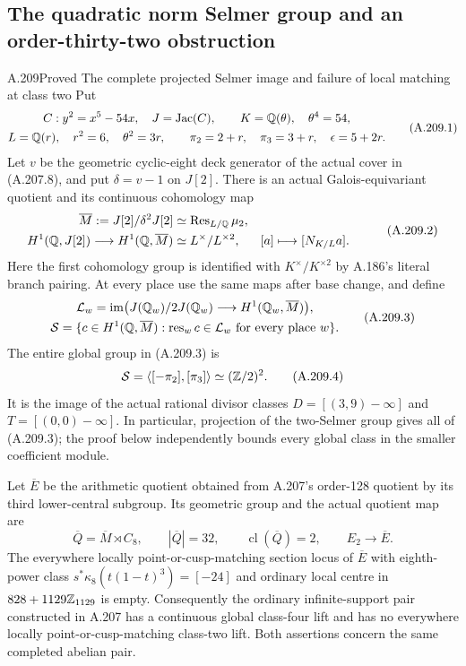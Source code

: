 \subsection{The quadratic norm Selmer group and an order-thirty-two obstruction}

\begin{statement}{A.209}{Proved}
{The complete projected Selmer image and failure of local matching at class two}
Put
\[
\begin{gathered}
 C:y^2=x^5-54x,\quad J=\operatorname{Jac}(C),\qquad
 K=\mathbb Q(\theta),\quad \theta^4=54,\\
 L=\mathbb Q(r),\quad r^2=6,\quad\theta^2=3r,\qquad
 \pi_2=2+r,\quad\pi_3=3+r,\quad\epsilon=5+2r.
\end{gathered}
\tag{A.209.1}
\]
Let \(v\) be the geometric cyclic-eight deck generator of
the actual cover in (A.207.8), and put \(\delta=v-1\)
on \(J[2]\).  There is an actual Galois-equivariant
quotient and its continuous cohomology map
\[
\begin{aligned}
 \overline M:=J[2]/\delta^2J[2]
      &\simeq\operatorname{Res}_{L/\mathbb Q}\mu_2,\\
 H^1(\mathbb Q,J[2])\longrightarrow H^1(\mathbb Q,\overline M)
      &\simeq L^\times/L^{\times2},
 & [a]&\longmapsto[N_{K/L}a].
\end{aligned}
\tag{A.209.2}
\]
Here the first cohomology group is identified with
\(K^\times/K^{\times2}\) by A.186's literal branch
pairing.  At every place use the same maps after base change,
and define
\[
\begin{gathered}
 \mathcal L_w=\operatorname{im}\bigl(
 J(\mathbb Q_w)/2J(\mathbb Q_w)\longrightarrow H^1(\mathbb Q_w,\overline M)
 \bigr),\\
 \mathcal S=\{c\in H^1(\mathbb Q,\overline M):
                   \operatorname{res}_w c\in\mathcal L_w
                   \text{ for every place }w\}.
\end{gathered}
\tag{A.209.3}
\]
The entire global group in (A.209.3) is
\[
 \mathcal S=\langle[-\pi_2],[\pi_3]\rangle
       \simeq(\mathbb Z/2)^2.
\tag{A.209.4}
\]
It is the image of the actual rational divisor classes
\(D=[(3,9)-\infty]\) and \(T=[(0,0)-\infty]\).
In particular, projection of the two-Selmer group gives
all of (A.209.3); the proof below independently bounds
every global class in the smaller coefficient module.

Let \(\overline E\) be the arithmetic quotient obtained
from A.207's order-128 quotient by its third lower-central
subgroup.  Its geometric group and the actual quotient map are
\[
 \overline Q=\overline M\rtimes C_8,
 \qquad |\overline Q|=32,
 \qquad\operatorname{cl}(\overline Q)=2,
 \qquad E_2\longrightarrow\overline E.
\tag{A.209.5}
\]
The everywhere locally point-or-cusp-matching section locus
of \(\overline E\) with eighth-power class
\(s^*\kappa_8(t(1-t)^3)=[-24]\) and ordinary local
centre in \(828+1129\mathbb Z_{1129}\) is empty.
Consequently the ordinary infinite-support pair constructed
in A.207 has a continuous global class-four lift and has
no everywhere locally point-or-cusp-matching class-two lift.
Both assertions concern the same completed abelian pair.
\end{statement}

